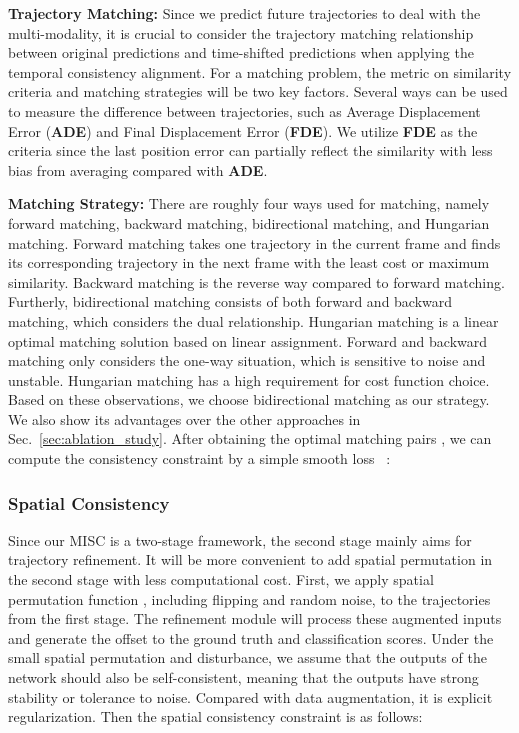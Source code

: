 \documentclass[10pt,twocolumn,letterpaper]{article}
\begin{document}
\noindent\textbf{Trajectory Matching:} Since we predict  future trajectories to deal with the multi-modality, it is crucial to consider the trajectory matching relationship between original predictions and time-shifted predictions when applying the temporal consistency alignment. For a matching problem, the metric on similarity criteria and matching strategies will be two key factors. Several ways can be used to measure the difference between trajectories, such as Average Displacement Error (\textbf{ADE}) and Final Displacement Error (\textbf{FDE}). We utilize \textbf{FDE} as the criteria since the last position error can partially reflect the similarity with less bias from averaging compared with \textbf{ADE}.

\noindent\textbf{Matching Strategy:} There are roughly four ways used for matching, namely forward matching, backward matching, bidirectional matching, and Hungarian matching. Forward matching takes one trajectory in the current frame and finds its corresponding trajectory in the next frame with the least cost or maximum similarity. Backward matching is the reverse way compared to forward matching. Furtherly, bidirectional matching consists of both forward and backward matching, which considers the dual relationship. Hungarian matching is a linear optimal matching solution based on linear assignment. Forward and backward matching only considers the one-way situation, which is sensitive to noise and unstable. Hungarian matching has a high requirement for cost function choice. Based on these observations, we choose bidirectional matching as our strategy. We also show its advantages over the other approaches in Sec.~\ref{sec:ablation_study}.  After obtaining the optimal matching pairs , we can compute the consistency constraint by a simple smooth  loss~\cite{Ren2015Faster} :


\vspace{-3mm}
\subsubsection{Spatial Consistency}
Since our MISC is a two-stage framework, the second stage mainly aims for trajectory refinement. It will be more convenient to add spatial permutation in the second stage with less computational cost. First, we apply spatial permutation function , including flipping and random noise, to the trajectories from the first stage. The refinement module will process these augmented inputs and generate the offset to the ground truth and classification scores. Under the small spatial permutation and disturbance, we assume that the outputs of the network should also be self-consistent, meaning that the outputs have strong stability or tolerance to noise. Compared with data augmentation, it is explicit regularization. Then the spatial consistency constraint  is as follows:
\end{document}
